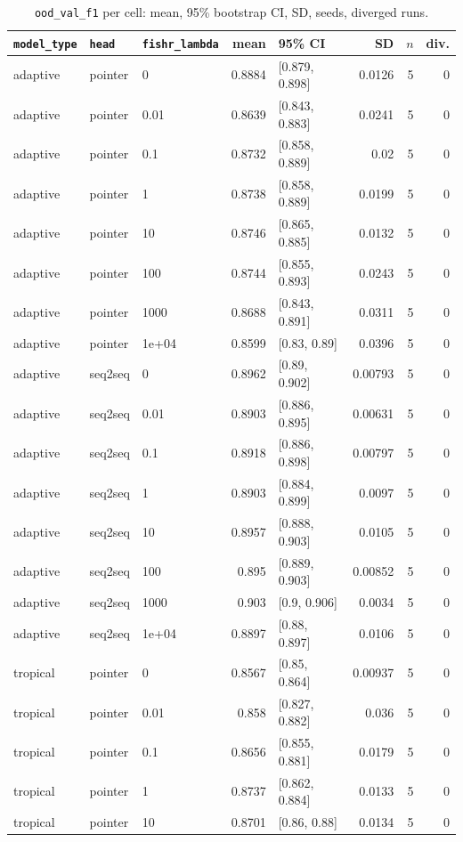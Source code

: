 \documentclass[10pt]{article}
\begin{document}
{\small
\begin{longtable}{lllrlrrr}
\caption{\texttt{ood\_val\_f1} per cell: mean, 95\% bootstrap CI, SD, seeds, diverged runs.}\label{tab:summary-ood_val_f1}\\
\toprule
\texttt{model\_type} & \texttt{head} & \texttt{fishr\_lambda} & mean & 95\% CI & SD & $n$ & div.\\
\midrule
\endhead
adaptive & pointer & 0 & 0.8884 & [0.879, 0.898] & 0.0126 & 5 & 0\\
adaptive & pointer & 0.01 & 0.8639 & [0.843, 0.883] & 0.0241 & 5 & 0\\
adaptive & pointer & 0.1 & 0.8732 & [0.858, 0.889] & 0.02 & 5 & 0\\
adaptive & pointer & 1 & 0.8738 & [0.858, 0.889] & 0.0199 & 5 & 0\\
adaptive & pointer & 10 & 0.8746 & [0.865, 0.885] & 0.0132 & 5 & 0\\
adaptive & pointer & 100 & 0.8744 & [0.855, 0.893] & 0.0243 & 5 & 0\\
adaptive & pointer & 1000 & 0.8688 & [0.843, 0.891] & 0.0311 & 5 & 0\\
adaptive & pointer & 1e+04 & 0.8599 & [0.83, 0.89] & 0.0396 & 5 & 0\\
adaptive & seq2seq & 0 & 0.8962 & [0.89, 0.902] & 0.00793 & 5 & 0\\
adaptive & seq2seq & 0.01 & 0.8903 & [0.886, 0.895] & 0.00631 & 5 & 0\\
adaptive & seq2seq & 0.1 & 0.8918 & [0.886, 0.898] & 0.00797 & 5 & 0\\
adaptive & seq2seq & 1 & 0.8903 & [0.884, 0.899] & 0.0097 & 5 & 0\\
adaptive & seq2seq & 10 & 0.8957 & [0.888, 0.903] & 0.0105 & 5 & 0\\
adaptive & seq2seq & 100 & 0.895 & [0.889, 0.903] & 0.00852 & 5 & 0\\
adaptive & seq2seq & 1000 & 0.903 & [0.9, 0.906] & 0.0034 & 5 & 0\\
adaptive & seq2seq & 1e+04 & 0.8897 & [0.88, 0.897] & 0.0106 & 5 & 0\\
tropical & pointer & 0 & 0.8567 & [0.85, 0.864] & 0.00937 & 5 & 0\\
tropical & pointer & 0.01 & 0.858 & [0.827, 0.882] & 0.036 & 5 & 0\\
tropical & pointer & 0.1 & 0.8656 & [0.855, 0.881] & 0.0179 & 5 & 0\\
tropical & pointer & 1 & 0.8737 & [0.862, 0.884] & 0.0133 & 5 & 0\\
tropical & pointer & 10 & 0.8701 & [0.86, 0.88] & 0.0134 & 5 & 0\\

\end{longtable}}
\end{document}
